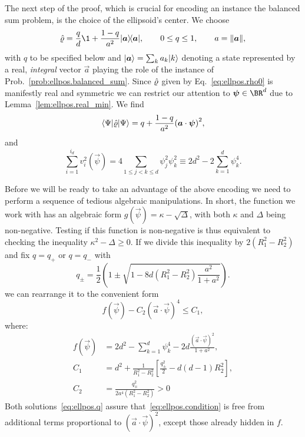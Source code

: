 The next step of the proof, which is crucial for encoding an instance  the balanced sum problem, is the choice of the ellipsoid's center.
We choose
\begin{equation}
  \estim{\varrho}=\frac{q}{d}\1+\frac{1-q}{a^{2}} \ket{\vec a} \bra{\vec a},\qquad0\leq q\leq1,\qquad a=\norm{\vec a},
  \label{eq:ellpos.rho0}
\end{equation}
with $q$ to be specified below and $\ket{\vec a} =\sum_{k}a_{k}\ket{k} $ denoting a state represented by a real, \emph{integral} vector $\vec{a}$ playing the role of the instance of Prob.~\ref{prob:ellpos.balanced_sum}. %
Since $\hat{\varrho}$ given by Eq.~\eqref{eq:ellpos.rho0} is manifestly real and symmetric we can restrict our attention to $\vec\psi \in \BR^d$ due to Lemma~\ref{lem:ellpos.real_min}. We find
\begin{equation}
  \bra{\Psi}\estim{\varrho} \ket{\Psi} =q+\frac{1-q}{a^{2}}{\left(\vec{a}\cdot\vec{\psi}\right)}^{2},
\end{equation}
and
\begin{equation}
  \sum_{i=1}^{i_{d}}v_{i}^{2}\left(\vec\psi\right)=4\sum_{1\leq j<k\leq d}\psi_{j}^{2}\psi_{k}^{2}\equiv2d^{2}-2\sum_{k=1}^{d}\psi_{k}^{4}.
\end{equation}

Before we will be ready to take an advantage of the above encoding we need to  perform a sequence of tedious algebraic manipulations. In short, the function we work with has an algebraic form $g(\vec\psi)=\kappa-\sqrt{\Delta}$, with both $\kappa$ and $\Delta$ being non-negative. Testing if this function is non-negative is thus equivalent to checking the inequality $\kappa^2- \Delta\geq 0$. If we divide this inequality by $2(R_1^2-R_2^2)$ and fix $q=q_+$ or $q=q_-$ with
\begin{equation}
  q_{\pm}=\frac{1}{2}\left(1\pm\sqrt{1-8d\left(R_{1}^{2}-R_{2}^{2}\right)\frac{a^{2}}{1+a^{2}}}\right).\label{eq:ellpos.q}
\end{equation}
we can rearrange it to the convenient form
\begin{equation}
  f\left(\vec{\psi}\right)-C_{2}{\left(\vec{a}\cdot\vec{\psi}\right)}^{4}\leq C_{1},
  \label{eq:ellpos.condition}
\end{equation}
where:
\begin{align}
  f\left(\vec{\psi}\right) &= 2d^{2}-\sum_{k=1}^{d}\psi_{k}^{4}-2d\frac{{\left(\vec{a}\cdot\vec{\psi}\right)}^{2}}{1+a^{2}}, \\
  \label{eq:ellpos.def_c1}
  C_{1}&=d^{2}+\frac{1}{R_{1}^{2}-R_{2}^{2}}\left[\frac{q_{\pm}^{2}}{2}-d\left(d-1\right)R_{2}^{2}\right], \\
  C_{2}&=\frac{q_{\mp}^{2}}{2a^{4}\left(R_{1}^{2}-R_{2}^{2}\right)}>0
\end{align}
Both solutions~\eqref{eq:ellpos.q} assure that~\eqref{eq:ellpos.condition} is free from additional terms proportional to ${\left(\vec{a}\cdot\vec{\psi}\right)}^{2}$, except those already hidden in $f$.


